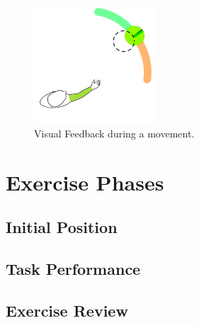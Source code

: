 \begin{figure}[!t]
    \begin{center}
        \includegraphics[width=0.4\textwidth]{imgs/movementguidancefeedback.png}
    \end{center}
    \caption{Visual Feedback during a movement.}
    \label{fig:movementguidancefeedback}
\end{figure}


\section{Exercise Phases}

\subsection{Initial Position}
\subsection{Task Performance}
\subsection{Exercise Review}



